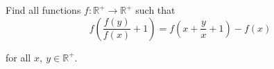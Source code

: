 Find all functions $f:\mathbb R^{+} \rightarrow \mathbb R^{+}$ such that$$f\left(\frac{f(y)}{f(x)}+1\right)=f\left(x+\frac{y}{x}+1\right)-f(x)$$

for all $x,\ y\in\mathbb{R^{+}}$.